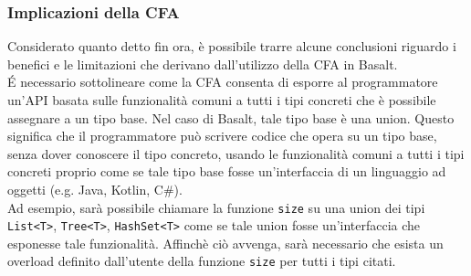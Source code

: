 \subsubsection{Implicazioni della CFA}
Considerato quanto detto fin ora, è possibile trarre alcune conclusioni riguardo i benefici
e le limitazioni che derivano dall'utilizzo della CFA in Basalt. \\

É necessario sottolineare come la CFA consenta di esporre al programmatore un'API basata 
sulle funzionalità comuni a tutti i tipi concreti che è possibile assegnare a un tipo 
base. Nel caso di Basalt, tale tipo base è una union. Questo significa che il programmatore
può scrivere codice che opera su un tipo base, senza dover conoscere il tipo concreto,
usando le funzionalità comuni a tutti i tipi concreti proprio come se tale tipo base fosse un'interfaccia
di un linguaggio ad oggetti (e.g. Java, Kotlin, C\#). \\

Ad esempio, sarà possibile chiamare la funzione \texttt{size} su una union dei tipi 
\texttt{List<T>}, \texttt{Tree<T>}, \texttt{HashSet<T>} come se tale union fosse un'interfaccia
che esponesse tale funzionalità. Affinchè ciò avvenga, sarà necessario che esista un
overload definito dall'utente della funzione \texttt{size} per tutti i tipi citati.